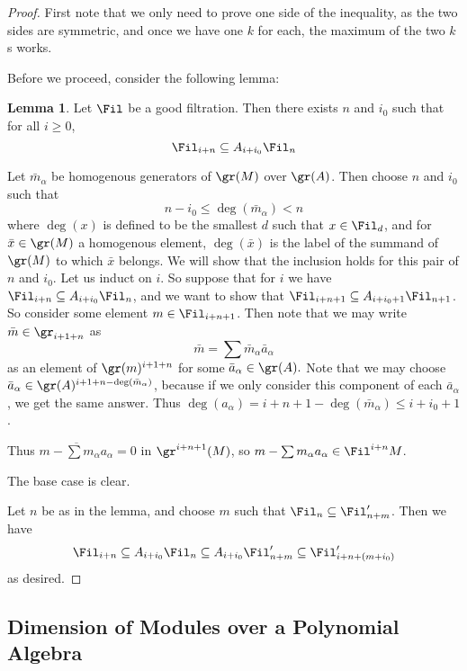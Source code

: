 \documentclass[12 pt]{article}
\theoremstyle{definition}
\newtheorem{lemma}[thm]{Lemma}
\renewcommand{\(}{\left(}
\renewcommand{\)}{\right)}
\newcommand\ol{\overline}
\begin{document}
\begin{proof}
First note that we only need to prove one side of the inequality, as the two sides are symmetric, and once we have one $k$ for each, the maximum of the two $k$s works.

Before we proceed, consider the following lemma:

\begin{lemma} Let $\Fil$ be a good filtration. Then there exists $n$ and $i_0$ such that for all $i \geq 0$,
\[\Fil_{i+n} \subseteq A_{i+i_0}\Fil_n\]
\end{lemma}

 Let $\bar{m}_\alpha$ be homogenous generators of $\gr(M)$ over $\gr(A)$. Then choose $n$ and $i_0$ such that
\[n-i_0 \leq \deg(\bar{m}_\alpha) < n\]
where $\deg(x)$ is defined to be the smallest $d$ such that $x \in \Fil_d$, and for $\bar{x} \in \gr(M)$ a homogenous element, $\deg(\bar{x})$ is the label of the summand of $\gr(M)$ to which $\bar{x}$ belongs.
We will show that the inclusion holds for this pair of $n$ and $i_0$. Let us induct on $i$. So suppose that for $i$ we have $\Fil_{i+n} \subseteq A_{i+i_0} \Fil_n$, and we want to show that $\Fil_{i+n+1} \subseteq A_{i+i_0+1} \Fil_{n+1}$. So consider some element $m \in \Fil_{i+n+1}$. Then note that we may write $\bar{m} \in \gr_{i+1+n}$ as
\[\bar{m}=\sum \bar{m}_\alpha \bar a_\alpha\]
as an element of $\gr(m)^{i+1+n}$ for some $\bar a_\alpha \in \gr(A).$ Note that we may choose $\bar a_\alpha \in \gr(A)^{i+1+n-\deg(\bar m_\alpha)}$, because if we only consider this component of each $\bar a_\alpha$, we get the same answer. Thus $\deg(a_\alpha)=i+n+1-\deg(\bar m_\alpha) \leq i+i_0+1$.

Thus $\ol{m-\sum m_\alpha a_\alpha}=0$ in $\gr^{i+n+1}(M)$, so $m-\sum m_\alpha a_\alpha \in \Fil^{i+n}M$.

The base case is clear.

\medskip

 Let $n$ be as in the lemma, and choose $m$ such that $\Fil_n \subseteq \Fil_{n+m}'$. Then we have
\[\Fil_{i+n} \subseteq A_{i+i_0} \Fil_n \subseteq A_{i+i_0}\Fil_{n+m}' \subseteq \Fil_{i+n+(m+i_0)}'\]
as desired.

\end{proof}



\subsection{Dimension of Modules over a Polynomial Algebra}
\end{document}
